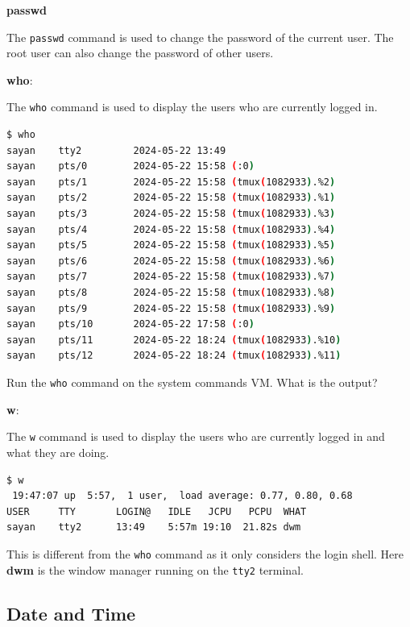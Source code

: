 \textbf{passwd}

The \texttt{passwd} command is used to change the password of the current user.
The root user can also change the password of other users.

\textbf{who}:

The \texttt{who} command is used to display the users who are currently logged in.

\begin{lstlisting}[language=bash]
$ who
sayan    tty2         2024-05-22 13:49
sayan    pts/0        2024-05-22 15:58 (:0)
sayan    pts/1        2024-05-22 15:58 (tmux(1082933).%2)
sayan    pts/2        2024-05-22 15:58 (tmux(1082933).%1)
sayan    pts/3        2024-05-22 15:58 (tmux(1082933).%3)
sayan    pts/4        2024-05-22 15:58 (tmux(1082933).%4)
sayan    pts/5        2024-05-22 15:58 (tmux(1082933).%5)
sayan    pts/6        2024-05-22 15:58 (tmux(1082933).%6)
sayan    pts/7        2024-05-22 15:58 (tmux(1082933).%7)
sayan    pts/8        2024-05-22 15:58 (tmux(1082933).%8)
sayan    pts/9        2024-05-22 15:58 (tmux(1082933).%9)
sayan    pts/10       2024-05-22 17:58 (:0)
sayan    pts/11       2024-05-22 18:24 (tmux(1082933).%10)
sayan    pts/12       2024-05-22 18:24 (tmux(1082933).%11)
\end{lstlisting}

\begin{exercise}
  Run the \texttt{who} command on the system commands VM.
  What is the output?
\end{exercise}

\textbf{w}:

The \texttt{w} command is used to display the users who are currently logged in and what they are doing.

\begin{lstlisting}[language=bash]
$ w
 19:47:07 up  5:57,  1 user,  load average: 0.77, 0.80, 0.68
USER     TTY       LOGIN@   IDLE   JCPU   PCPU  WHAT
sayan    tty2      13:49    5:57m 19:10  21.82s dwm
\end{lstlisting}

This is different from the \texttt{who} command as it only considers the login shell.
Here \textbf{dwm} is the window manager running on the \texttt{tty2} terminal.

\subsection{Date and Time}


